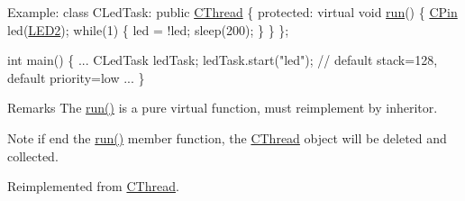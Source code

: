\begin{DoxyCode}
Example:
        \textcolor{keyword}{class }CLedTask: \textcolor{keyword}{public} \hyperlink{class_c_thread}{CThread} \{
        \textcolor{keyword}{protected}:
            \textcolor{keyword}{virtual} \textcolor{keywordtype}{void} \hyperlink{class_c_debug_a9a3e40cc8ee5d0c2a41577f658779c71}{run}() \{
                \hyperlink{class_c_pin}{CPin} led(\hyperlink{group___peripheral_gga65a2241721e4acb573e0c3fe29ac432fa8379bbaa96d151e6adac488b2a147b7a}{LED2});
                \textcolor{keywordflow}{while}(1) \{
                    led = !led;
                    sleep(200);
                \}
            \}
        \};

        \textcolor{keywordtype}{int} main() \{
            ...
            CLedTask ledTask;
            ledTask.start(\textcolor{stringliteral}{"led"});   \textcolor{comment}{// default stack=128, default priority=low}
            ...
        \}
\end{DoxyCode}
 \begin{DoxyRemark}{Remarks}
The \hyperlink{class_c_debug_a9a3e40cc8ee5d0c2a41577f658779c71}{run()} is a pure virtual function, must reimplement by inheritor. 
\end{DoxyRemark}
\begin{DoxyNote}{Note}
if end the \hyperlink{class_c_debug_a9a3e40cc8ee5d0c2a41577f658779c71}{run()} member function, the \hyperlink{class_c_thread}{C\-Thread} object will be deleted and collected. 
\end{DoxyNote}


Reimplemented from \hyperlink{class_c_thread_a071c3d3b3c19a7bd6a01aca073a9b4d7}{C\-Thread}.



